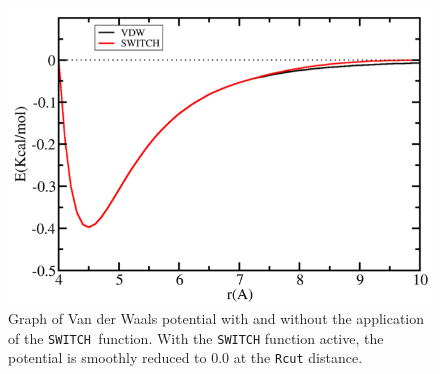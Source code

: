 \begin{figure}[H]
\centering
\includegraphics[scale=1.0]{images/SWITCH}
\caption{Graph of Van der Waals potential with and without the application of the \texttt{SWITCH }function. With the \texttt{SWITCH} function active, the potential is smoothly reduced to 0.0 at the \texttt{Rcut} distance. }
\end{figure}

